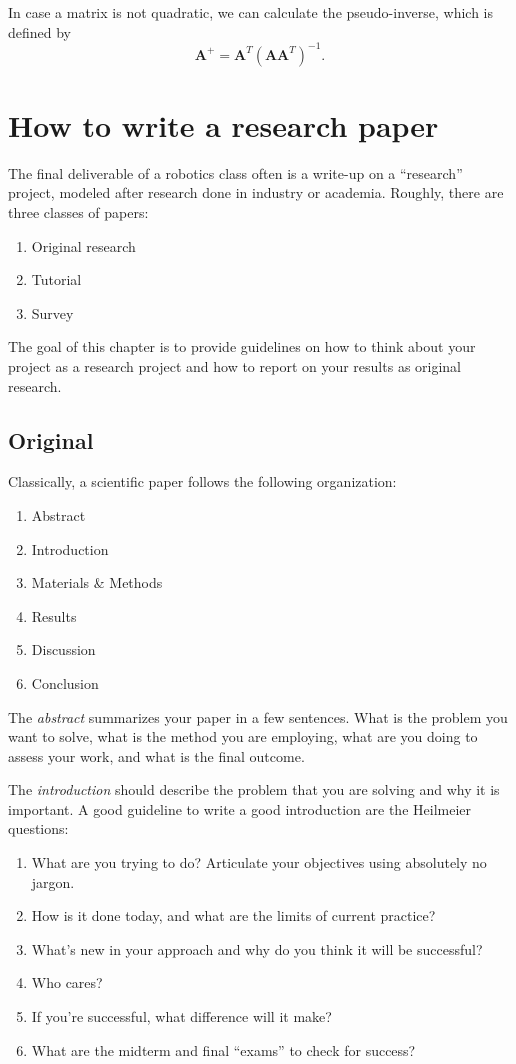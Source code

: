 \documentclass[paper=6.14in:9.21in,pagesize=pdftex,11pt,twoside,openright]{scrbook}
\begin{document}
In case a matrix is not quadratic, we can calculate the pseudo-inverse, which is defined by
\begin{equation}
\mathbf{A}^+=\mathbf{A}^T(\mathbf{AA}^T)^{-1}.
\end{equation}



\chapter{How to write a research paper}
The final deliverable of a robotics class often is a write-up on a ``research'' project, modeled after research done in industry or academia. Roughly, there are three classes of papers:

\begin{enumerate}
\item Original research
\item Tutorial
\item Survey
\end{enumerate}

The goal of this chapter is to provide guidelines on how to think about your project as a research project and how to report on your results as original research.

\section{Original}
Classically, a scientific paper follows the following organization:
\begin{enumerate}
\item Abstract
\item Introduction
\item Materials \& Methods
\item Results
\item Discussion
\item Conclusion
\end{enumerate}

The \emph{abstract} summarizes your paper in a few sentences. What is the problem you want to solve, what is the method you are employing, what are you doing to assess your work, and what is the final outcome.

The \emph{introduction} should describe the problem that you are solving and why it is important. A good guideline to write a good introduction are the Heilmeier questions:

\begin{enumerate}
\item What are you trying to do? Articulate your objectives using absolutely no jargon.
\item How is it done today, and what are the limits of current practice?
\item What's new in your approach and why do you think it will be successful?
\item Who cares?
\item If you're successful, what difference will it make?
\item What are the midterm and final ``exams'' to check for success?
\end{enumerate}
\end{document}

